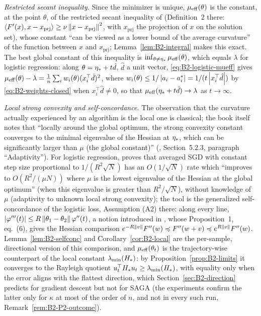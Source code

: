 \emph{Restricted secant inequality.} Since the minimizer is unique, $\mu_{\mathrm{eff}}(\theta)$ is the constant, at the point
$\theta$, of the restricted secant inequality of \cite{zhang2013gradient} (Definition~2 there:
$\left\langle F'(x), x-x_{\mathrm{prj}} \right\rangle\ge\nu\left\|x-x_{\mathrm{prj}}\right\|^2$, with $x_{\mathrm{prj}}$ the projection of $x$ on the
solution set), whose constant ``can be viewed as a lower bound of the average curvature'' of the function between $x$
and $x_{\mathrm{prj}}$; Lemma~\ref{lem:B2-integral} makes this exact. The best global constant of this inequality is
$\inf_{\theta\neq\eta_\ast}\mu_{\mathrm{eff}}(\theta)$, which equals $\lambda$ for logistic regression: along $\theta=\eta_\ast+t\hat d$,
$\hat d$ a unit vector, \eqref{eq:B2-logistic-mueff} gives $\mu_{\mathrm{eff}}(\theta)-\lambda=\frac1n\sum_iw_i(\theta)(x_i^\top\hat d)^2$,
where $w_i(\theta)\le1/\left|a_i-a_i^\ast\right|=1/(t\left|x_i^\top\hat d\right|)$ by \eqref{eq:B2-weights-closed} when
$x_i^\top\hat d\neq0$, so that $\mu_{\mathrm{eff}}(\eta_\ast+t\hat d)\to\lambda$ as $t\to\infty$.

\emph{Local strong convexity and self-concordance.} The observation that the curvature actually experienced by an
algorithm is the local one is classical; the book itself notes that ``locally around the global optimum, the
strong convexity constant converges to the minimal eigenvalue of the Hessian at $\eta_\ast$, which can be
significantly larger than $\mu$ (the global constant)'' (\cite{bach2024learning}, Section~5.2.3, paragraph
``Adaptivity''). For logistic regression, \cite{bach2014adaptivity} proves that averaged SGD with constant
step size proportional to $1/(R^2\sqrt N)$ has an $O(1/\sqrt N)$ rate which ``improves to $O(R^2/(\mu N))$ where
$\mu$ is the lowest eigenvalue of the Hessian at the global optimum'' (when this eigenvalue is greater than
$R^2/\sqrt N$), without knowledge of $\mu$
(adaptivity to unknown local strong convexity); the tool is the generalized self-concordance of the logistic
loss, Assumption (A2) there: along every line, $\left|\varphi'''(t)\right|\le R\left\|\theta_1-\theta_2\right\|\varphi''(t)$, a
notion introduced in \cite{bach2010self}, whose Proposition~1, eq.~(6), gives the Hessian comparison
$e^{-R\left\|v\right\|}F''(w)\preccurlyeq F''(w+v)\preccurlyeq e^{R\left\|v\right\|}F''(w)$. Lemma~\ref{lem:B2-selfconc} and
Corollary~\ref{cor:B2-local} are the per-sample, directional version of this comparison, and $\mu_{\mathrm{eff}}(\theta_t)$ is
the trajectory-wise counterpart of the local constant $\lambda_{\min}(H_\ast)$: by Proposition~\ref{prop:B2-limits} it
converges to the Rayleigh quotient $u_t^\top H_\ast u_t\ge\lambda_{\min}(H_\ast)$, with equality only when the error aligns
with the flattest direction, which Section~\ref{sec:B2-direction} predicts for gradient descent but not for
SAGA (the experiments confirm the latter only for $\kappa$ at most of the order of $n$, and not in every such run,
Remark~\ref{rem:B2-P2-outcome}).

